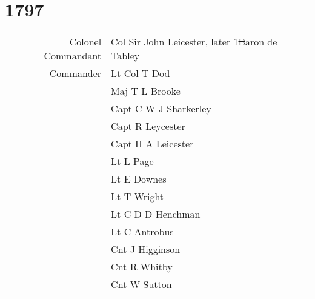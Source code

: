 \chapter*{1797}

\begin{center}
  \begin{tabular}{rl}
    Colonel Commandant & Col Sir John Leicester, later 1\st Baron de Tabley \\
    Commander & Lt Col T Dod \\
    & Maj T L Brooke \\
    & Capt C W J Sharkerley \\
    & Capt R Leycester \\
    & Capt H A Leicester \\
    & Lt L Page \\
    & Lt E Downes \\
    & Lt T Wright \\
    & Lt C D D Henchman \\
    & Lt C Antrobus \\
    & Cnt J Higginson \\
    & Cnt R Whitby \\
    & Cnt W Sutton \\
  \end{tabular}
\end{center}
